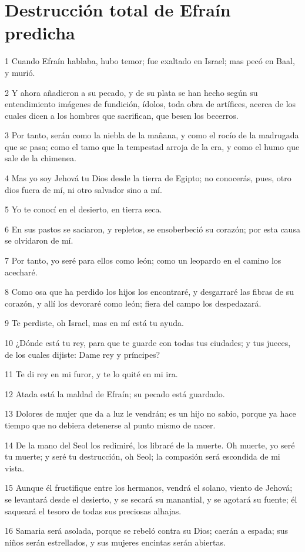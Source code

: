 \section*{Destrucción total de Efraín predicha}

\par 1 Cuando Efraín hablaba, hubo temor; fue exaltado en Israel; mas pecó en Baal, y murió.
\par 2 Y ahora añadieron a su pecado, y de su plata se han hecho según su entendimiento imágenes de fundición, ídolos, toda obra de artífices, acerca de los cuales dicen a los hombres que sacrifican, que besen los becerros.
\par 3 Por tanto, serán como la niebla de la mañana, y como el rocío de la madrugada que se pasa; como el tamo que la tempestad arroja de la era, y como el humo que sale de la chimenea.
\par 4 Mas yo soy Jehová tu Dios desde la tierra de Egipto; no conocerás, pues, otro dios fuera de mí, ni otro salvador sino a mí.
\par 5 Yo te conocí en el desierto, en tierra seca.
\par 6 En sus pastos se saciaron, y repletos, se ensoberbeció su corazón; por esta causa se olvidaron de mí.
\par 7 Por tanto, yo seré para ellos como león; como un leopardo en el camino los acecharé.
\par 8 Como osa que ha perdido los hijos los encontraré, y desgarraré las fibras de su corazón, y allí los devoraré como león; fiera del campo los despedazará.
\par 9 Te perdiste, oh Israel, mas en mí está tu ayuda.
\par 10 ¿Dónde está tu rey, para que te guarde con todas tus ciudades; y tus jueces, de los cuales dijiste: Dame rey y príncipes?
\par 11 Te di rey en mi furor, y te lo quité en mi ira. 
\par 12 Atada está la maldad de Efraín; su pecado está guardado.
\par 13 Dolores de mujer que da a luz le vendrán; es un hijo no sabio, porque ya hace tiempo que no debiera detenerse al punto mismo de nacer.
\par 14 De la mano del Seol los redimiré, los libraré de la muerte. Oh muerte, yo seré tu muerte; y seré tu destrucción, oh Seol; la compasión será escondida de mi vista.
\par 15 Aunque él fructifique entre los hermanos, vendrá el solano, viento de Jehová; se levantará desde el desierto, y se secará su manantial, y se agotará su fuente; él saqueará el tesoro de todas sus preciosas alhajas.
\par 16 Samaria será asolada, porque se rebeló contra su Dios; caerán a espada; sus niños serán estrellados, y sus mujeres encintas serán abiertas.


